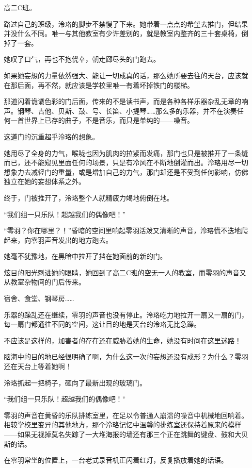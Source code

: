\documentclass[UTF8, scheme = chinese, openany]{ctexbook}
\begin{document}
高二C班。

路过自己的班级，泠珞的脚步不禁慢了下来。她带着一点点的希望去推门，但结果并没什么不同。唯一与其他教室有少许差别的，就是教室内整齐的三十套桌椅，倒掉了一套。

她叹了口气，再也不抱侥幸，朝走廊尽头的门跑去。

如果她妄想的力量依然强大、能让一切成真的话，那么她所要去往的天台，应该就在那后面，再不然，就应该是学校里唯一有着坏掉铁门的楼梯。

那道闪着诡谲色彩的门后面，传来的不是读书声，而是各种各样乐器杂乱无章的响声。钢琴、吉他、贝斯、鼓、号、长笛、小提琴……那么多的乐器，并不在演奏任何一首世界上已存的曲子，不是音乐，而只是单纯的——噪音。

这道门的沉重超乎泠珞的想象。

她用尽了全身的力气，喉咙也因为肌肉的拉紧而发痛，那门也只是被推开了一条缝而已，还不能窥见里面任何的场景，只是有冷风在不断地倒灌而出。泠珞用尽一切想象力去减轻门的重量，或是增加自己的力气，那门却还是不受到任何影响，仿佛独立在她的妄想体系之外。

终于，门被推开了，泠珞整个人就精疲力竭地俯倒在地。

“我们组一只乐队！超越我们的偶像吧！”

“零羽？你在哪里？！”昏暗的空间里响起零羽活泼又清晰的声音，泠珞慌不迭地爬起来，向零羽声音发出的地方跑去。

她毫不犹豫地，在黑暗中拉开了挡在她面前的新的门。

炫目的阳光刺进她的眼睛，她回到了高二C班的空无一人的教室，而零羽的声音又从教室杂物间的门后传来。

宿舍、食堂、钢琴房……

乐器的躁乱还在继续，零羽的声音也没有停止。泠珞吃力地拉开一扇又一扇的门，每一扇门都通往不同的空间，这让目的地是天台的泠珞无比急躁。

不应该是这样的，加害者的存在还在威胁着她的生命，她没有时间在这里迷路！

脑海中的目的地已经很明确了啊，为什么这一次的妄想还没有成形？为什么？零羽还在天台上等着她啊！

泠珞抓起一把椅子，砸向了最新出现的玻璃门。

“我们组一只乐队！超越我们的偶像吧！”

零羽的声音在黄昏的乐队排练室里，在足以令普通人崩溃的噪音中机械地回响着。相较学校里变异的其他地方，那个泠珞记忆中温馨的排练室还保持着原来的模样——如果无视掉莫名失踪了一大堆海报的墙还有那三个正在跳舞的键盘、鼓和大贝斯的话。

在零羽常坐的位置上，一台老式录音机正闪着红灯，反复播放着她的话语。
\end{document}

